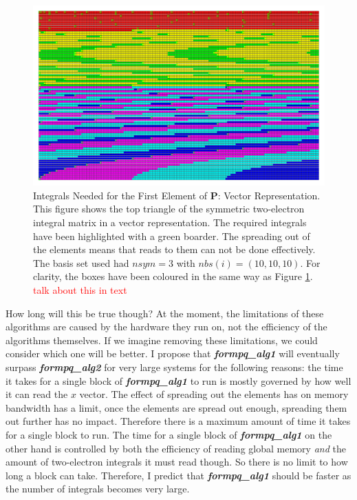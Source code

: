 \documentclass[12pt]{report}
\newcommand{\notetodylan}[1]{\textcolor{red}{#1}} %
\newcommand{\kernel}[1]{\textit{\textbf{#1}}}
\begin{document}
\begin{figure}
\includegraphics[width=1\textwidth]{Figures/eint2_vec_lots.png}
\caption[Integrals Needed for the First Element of \textbf{P}: Vector Representation]
{Integrals Needed for the First Element of \textbf{P}: Vector Representation. This figure shows the top triangle of the symmetric two-electron integral matrix in a vector representation. The required integrals have been highlighted with a green boarder.  The spreading out of the elements means that reads to them can not be done effectively. The basis set used had $nsym=3$ with $nbs(i) = (10, 10, 10)$. For clarity, the boxes have been coloured in the same way as Figure \ref{fig:eint2matlots}. \notetodylan{talk about this in text}}
\label{fig:eint2matlots}
\end{figure}


How long will this be true though? At the moment, the limitations of these algorithms are caused by the hardware they run on, not the efficiency of the algorithms themselves. If we imagine removing these limitations, we could consider which one will be better. I propose that \kernel{formpq\_alg1} will eventually surpass \kernel{formpq\_alg2} for very large systems for the following reasons: the time it takes for a single block of \kernel{formpq\_alg1} to run is mostly governed by how well it can read the $x$ vector. The effect of spreading out the elements has on memory bandwidth has a limit, once the elements are spread out enough, spreading them out further has no impact. Therefore there is a maximum amount of time it takes for a single block to run. The time for a single block of \kernel{formpq\_alg1} on the other hand is controlled by both the efficiency of reading global memory \textit{and} the amount of two-electron integrals it must read though. So there is no limit to how long a block can take. Therefore, I predict that \kernel{formpq\_alg1} should be faster as the number of integrals becomes very large.
\end{document}
